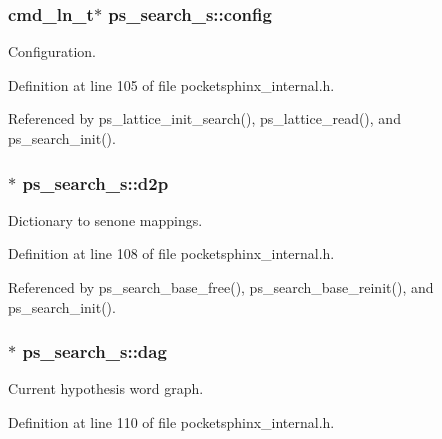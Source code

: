 \subsubsection[{config}]{\setlength{\rightskip}{0pt plus 5cm}cmd\+\_\+ln\+\_\+t$\ast$ ps\+\_\+search\+\_\+s\+::config}\label{structps__search__s_aa6e3e18165bbc70084a06575d5703042}


Configuration. 



Definition at line 105 of file pocketsphinx\+\_\+internal.\+h.



Referenced by ps\+\_\+lattice\+\_\+init\+\_\+search(), ps\+\_\+lattice\+\_\+read(), and ps\+\_\+search\+\_\+init().

\subsubsection[{d2p}]{$\ast$ ps\+\_\+search\+\_\+s\+::d2p}\label{structps__search__s_a81b461e7ef3a080d046039e186134a15}


Dictionary to senone mappings. 



Definition at line 108 of file pocketsphinx\+\_\+internal.\+h.



Referenced by ps\+\_\+search\+\_\+base\+\_\+free(), ps\+\_\+search\+\_\+base\+\_\+reinit(), and ps\+\_\+search\+\_\+init().

\subsubsection[{dag}]{$\ast$ ps\+\_\+search\+\_\+s\+::dag}\label{structps__search__s_a897f46c55d17e817ff1364f555b31463}


Current hypothesis word graph. 



Definition at line 110 of file pocketsphinx\+\_\+internal.\+h.



